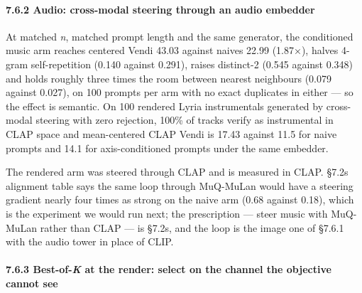 \documentclass[
  10pt,
]{article}
\theoremstyle{plain}
\theoremstyle{definition}
\begin{document}
\paragraph{7.6.2 Audio: cross-modal steering through an audio
embedder}\label{762-audio-cross-modal-steering-through-an-audio-embedder}

At matched \emph{n}, matched prompt length and the same generator, the
conditioned music arm reaches centered Vendi 43.03 against
naive\textquotesingle s 22.99 (1.87×), halves 4-gram self-repetition
(0.140 against 0.291), raises distinct-2 (0.545 against 0.348) and holds
roughly three times the room between nearest neighbours (0.079 against
0.027), on 100 prompts per arm with no exact duplicates in either --- so
the effect is semantic. On 100 rendered Lyria instrumentals generated by
cross-modal steering with zero rejection, 100\% of tracks verify as
instrumental in CLAP space and mean-centered CLAP Vendi is 17.43 against
11.5 for naive prompts and 14.1 for axis-conditioned prompts under the
same embedder.

The rendered arm was steered through CLAP and is measured in CLAP.
§7.2\textquotesingle s alignment table says the same loop through
MuQ-MuLan would have a steering gradient nearly four times as strong on
the naive arm (0.68 against 0.18), which is the experiment we would run
next; the prescription --- steer music with MuQ-MuLan rather than CLAP
--- is §7.2\textquotesingle s, and the loop is the image one of §7.6.1
with the audio tower in place of CLIP.

\paragraph{\texorpdfstring{7.6.3 Best-of-\emph{K} at the render: select
on the channel the objective cannot
see}{7.6.3 Best-of-K at the render: select on the channel the objective cannot see}}\label{763-best-of-k-at-the-render-select-on-the-channel-the-objective-cannot-see}
\end{document}
